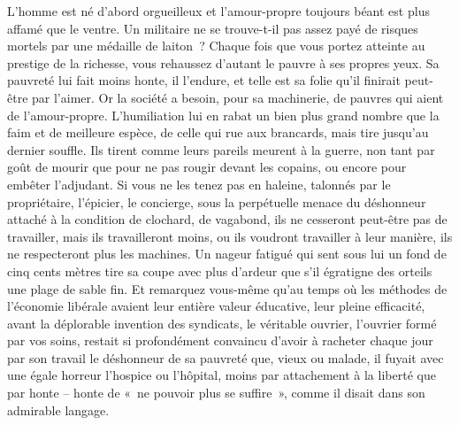 \documentclass[french,twoside]{book} %
\begin{document}
L’homme est né d’abord orgueilleux et l’amour-propre toujours béant est plus affamé que le ventre. Un militaire ne se trouve-t-il pas assez payé de risques mortels par une médaille de laiton ? Chaque fois que vous portez atteinte au prestige de la richesse, vous rehaussez d’autant le pauvre à ses propres yeux. Sa pauvreté lui fait moins honte, il l’endure, et telle est sa folie qu’il finirait peut-être par l’aimer. Or la société a besoin, pour sa machinerie, de pauvres qui aient de l’amour-propre. L’humiliation lui en rabat un bien plus grand nombre que la faim et de meilleure espèce, de celle qui rue aux brancards, mais tire jusqu’au dernier souffle. Ils tirent comme leurs pareils meurent à la guerre, non tant par goût de mourir que pour ne pas rougir devant les copains, ou encore pour embêter l’adjudant. Si vous ne les tenez pas en haleine, talonnés par le propriétaire, l’épicier, le concierge, sous la perpétuelle menace du déshonneur attaché à la condition de clochard, de vagabond, ils ne cesseront peut-être pas de travailler, mais ils travailleront moins, ou ils voudront travailler à leur manière, ils ne respecteront plus les machines. Un nageur fatigué qui sent sous lui un fond de cinq cents mètres tire sa coupe avec plus d’ardeur que s’il égratigne des orteils une plage de sable fin. Et remarquez vous-même qu’au temps où les méthodes de l’économie libérale avaient leur entière valeur éducative, leur pleine efficacité, avant la déplorable invention des syndicats, le véritable ouvrier, l’ouvrier formé par vos soins, restait si profondément convaincu d’avoir à racheter chaque jour par son travail le déshonneur de sa pauvreté que, vieux ou malade, il fuyait avec une égale horreur l’hospice ou l’hôpital, moins par attachement à la liberté que par honte – honte de « ne pouvoir plus se suffire », comme il disait dans son admirable langage.\par
\end{document}
